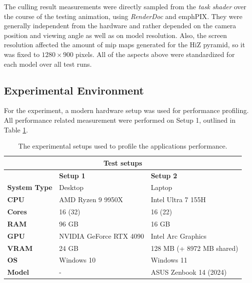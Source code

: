 \noindent
The culling result measurements were directly sampled from the \emph{task shader} over the course of the testing 
animation, using \emph{RenderDoc} and emph{PIX}. They were generally independent from the hardware and rather 
depended on the camera position and viewing angle as well as on model resolution. Also, the screen resolution 
affected the amount of mip maps generated for the \ac{HiZ} pyramid, so it was fixed to $1280 \times 900$ pixels. 
All of the aspects above were standardized for each model over all test runs.


\subsection*{Experimental Environment} \label{subsec-experimental-environment}

For the experiment, a modern hardware setup was used for performance profiling. All performance related 
measurement were performed on Setup 1, outlined in Table \ref{tbl:hardware-setup}.

\begin{table}[h]          %
    \begin{tabular}{|lll|}
        \hline
        \multicolumn{3}{|c|}{\textbf{Test setups}}                                                                              \\ \hline
        \multicolumn{1}{|l|}{}                     & \multicolumn{1}{l|}{\textbf{Setup 1}}          & \textbf{Setup 2}          \\ \hline
        \multicolumn{1}{|l|}{\textbf{System Type}} & \multicolumn{1}{l|}{Desktop}                   & Laptop                    \\
        \multicolumn{1}{|l|}{\textbf{CPU}}         & \multicolumn{1}{l|}{AMD Ryzen 9 9950X}         & Intel Ultra 7 155H        \\
        \multicolumn{1}{|l|}{\textbf{Cores}}       & \multicolumn{1}{l|}{16 (32)}                   & 16 (22)                   \\
        \multicolumn{1}{|l|}{\textbf{RAM}}         & \multicolumn{1}{l|}{96 GB}                     & 16 GB                     \\
        \multicolumn{1}{|l|}{\textbf{GPU}}         & \multicolumn{1}{l|}{NVIDIA GeForce RTX 4090}   & Intel Arc Graphics        \\
        \multicolumn{1}{|l|}{\textbf{VRAM}}        & \multicolumn{1}{l|}{24 GB}                     & 128 MB (+ 8972 MB shared) \\
        \multicolumn{1}{|l|}{\textbf{OS}}          & \multicolumn{1}{l|}{Windows 10}                & Windows 11                \\
        \multicolumn{1}{|l|}{\textbf{Model}}       & \multicolumn{1}{l|}{-}                         & ASUS Zenbook 14 (2024)    \\ \hline
    \end{tabular}
    \caption{The experimental setups used to profile the applications performance.}
    \label{tbl:hardware-setup}
\end{table}

